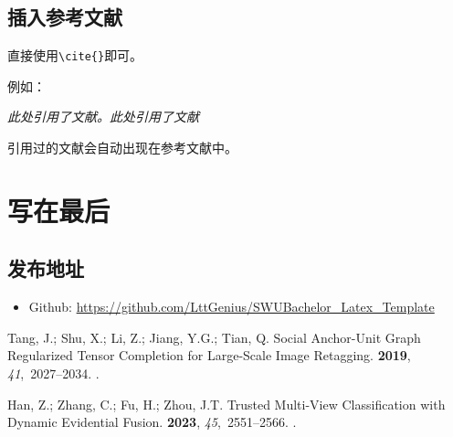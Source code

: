 \documentclass[zihao=-4,hyperref,a4paper,UTF8,autoindent=2em]{ctexart}
\begin{document}
%
%
%
%
%
%

\subsection{插入参考文献}
直接使用\verb|\cite{}|即可。

例如：


   \textit{ 此处引用了文献\cite{0Isaac}。此处引用了文献\cite{2016The}}


引用过的文献会自动出现在参考文献中。

\newpage\section{写在最后}
\subsection{发布地址}
\begin{itemize}
    \item Github: \url{https://github.com/LttGenius/SWUBachelor_Latex_Template}
\end{itemize}


\newpage
\begin{thebibliography}{999}

Tang, J.; Shu, X.; Li, Z.; Jiang, Y.G.; Tian, Q.
\newblock Social Anchor-Unit Graph Regularized Tensor Completion for
  Large-Scale Image Retagging.
  {\bf 2019}, {\em 41},~2027--2034.
.

Han, Z.; Zhang, C.; Fu, H.; Zhou, J.T.
\newblock Trusted Multi-View Classification with Dynamic Evidential Fusion.
  {\bf 2023}, {\em 45},~2551--2566.
.
\newpage
\end{thebibliography}
\end{document}
